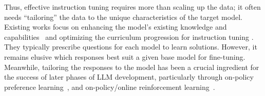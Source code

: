 

Thus, effective instruction tuning requires more than scaling up the data; 
it often needs  ``tailoring'' the data to the unique characteristics of the target model. Existing works focus on enhancing the model’s existing knowledge and capabilities~\cite{du2023modsmodelorienteddataselection} and optimizing the curriculum progression for instruction tuning \cite{zhao2024preliminarystudyintrinsicrelationship, lee2024instructiontuninghumancurriculum,feng2023citinglargelanguagemodels,setlur2024rlincorrectsyntheticdata}.
They typically prescribe questions for each model to learn solutions. However, it remains elusive which responses best suit a given base model for fine-tuning.
Meanwhile, tailoring the responses to the model has been a crucial ingredient for the success of later phases of LLM development, particularly through on-policy preference learning~\cite{tajwar2024shoulduse,zhang2024selfexploringlanguagemodelsactive,zhang2024textbfplumimprovingcodelms,miao2024aligningcodellmsdirectpreference,gulcehre2023rest,azar2023generaltheoreticalparadigmunderstand,tang2024understandingperformancegap,zhuang2023bpo}, and on-policy/online reinforcement learning~\cite{guo2024onlineaifeedback,liu2024provablymitigatingoveroptimizationrlhf,zhou2024wpoenhancingrlhfweighted}.

